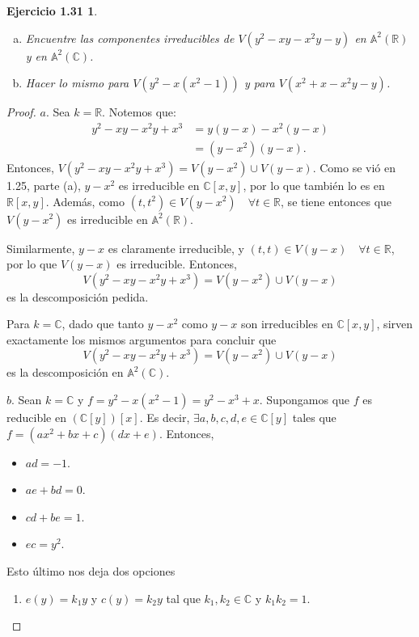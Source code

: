 \documentclass{amsart}
\theoremstyle{plain}
\newtheorem*{ejercicio4}{Ejercicio 1.31}
\newcommand{\R}{\mathbb{R}}
\newcommand{\C}{\mathbb{C}}
\begin{document}
	\begin{ejercicio4}
		\begin{enumerate}[a)]
			\item Encuentre las componentes irreducibles de $V(y^{2} - xy - x^{2}y - y)$ en $\mathbb{A}^{2}(\R)$ y en $\mathbb{A}^{2}(\C)$.

			\item Hacer lo mismo para $V(y^{2} - x(x^{2} - 1))$ y para $V(x^{2} + x - x^{2}y - y)$.
		\end{enumerate}
	\end{ejercicio4}
	\begin{proof}
		$\boxed{a.}$ Sea $k = \R$. Notemos que:
		\begin{align*}
			y^{2} - xy - x^{2}y + x^{3} &= y(y - x) - x^{2}(y - x) \\
			&= (y - x^{2})(y - x)
		.\end{align*}
		Entonces, $V(y^{2} - xy - x^{2}y + x^{3}) = V(y - x^{2}) \cup V(y - x)$. Como se vió en 1.25, parte (a), $y - x^{2}$ es irreducible en $\C[x,y]$, por lo que también lo es en $\R[x,y]$. Además, como $(t, t^{2}) \in V(y - x^{2}) \quad \forall t \in \R$, se tiene entonces que $V(y - x^{2})$ es irreducible en $\mathbb{A}^{2}(\R)$. \par
		Similarmente, $y - x$ es claramente irreducible, y $(t,t) \in V(y - x) \quad \forall t \in \R$, por lo que $V(y - x)$ es irreducible. Entonces,
		\[ V(y^{2} - xy - x^{2}y + x^{3}) = V(y - x^{2}) \cup V(y - x) \]
		es la descomposición pedida. \par
		Para $k = \C$, dado que tanto $y - x^{2}$ como $y - x$ son irreducibles en $\C[x,y]$, sirven exactamente los mismos argumentos para concluir que
		\[ V(y^{2} - xy - x^{2}y + x^{3}) = V(y - x^{2}) \cup V(y - x) \]
		es la descomposición en $\mathbb{A}^{2}(\C)$. \par
		$\boxed{b.}$ Sean $k = \C$ y $f = y^{2} - x(x^{2} - 1) = y^{2} - x^{3} + x$. Supongamos que $f$ es reducible en $(\C[y])[x]$. Es decir, $\exists a,b,c,d,e \in \C[y]$ tales que $f = (ax^{2} + bx + c)(dx + e)$. Entonces,
		\begin{itemize}
			\item $ad = -1$.

			\item $ae + bd = 0$.

			\item $cd + be = 1$.

			\item $ec = y^{2}$.
		\end{itemize}
		Esto último nos deja dos opciones
		\begin{enumerate}
			\item $e(y) = k_{1}y$ y $c(y) = k_{2}y$ tal que $k_{1},k_{2} \in \C$ y $k_{1}k_{2} = 1$.


\end{enumerate}
\end{proof}
\end{document}
